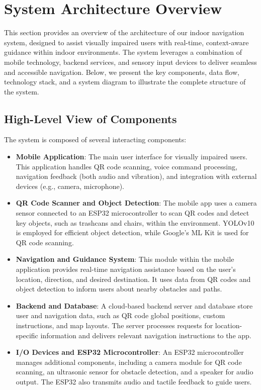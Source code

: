 \section{System Architecture Overview}

This section provides an overview of the architecture of our indoor navigation system, designed to assist visually impaired users with real-time, context-aware guidance within indoor environments. The system leverages a combination of mobile technology, backend services, and sensory input devices to deliver seamless and accessible navigation. Below, we present the key components, data flow, technology stack, and a system diagram to illustrate the complete structure of the system.

\subsection{High-Level View of Components}

The system is composed of several interacting components:

\begin{itemize}
	\item \textbf{Mobile Application}: The main user interface for visually impaired users. This application handles QR code scanning, voice command processing, navigation feedback (both audio and vibration), and integration with external devices (e.g., camera, microphone).
	\item \textbf{QR Code Scanner and Object Detection}: The mobile app uses a camera sensor connected to an ESP32 microcontroller to scan QR codes and detect key objects, such as trashcans and chairs, within the environment. YOLOv10 is employed for efficient object detection, while Google’s ML Kit is used for QR code scanning.
	\item \textbf{Navigation and Guidance System}: This module within the mobile application provides real-time navigation assistance based on the user’s location, direction, and desired destination. It uses data from QR codes and object detection to inform users about nearby obstacles and paths.
	\item \textbf{Backend and Database}: A cloud-based backend server and database store user and navigation data, such as QR code global positions, custom instructions, and map layouts. The server processes requests for location-specific information and delivers relevant navigation instructions to the app.
	\item \textbf{I/O Devices and ESP32 Microcontroller}: An ESP32 microcontroller manages additional components, including a camera module for QR code scanning, an ultrasonic sensor for obstacle detection, and a speaker for audio output. The ESP32 also transmits audio and tactile feedback to guide users.
\end{itemize}

